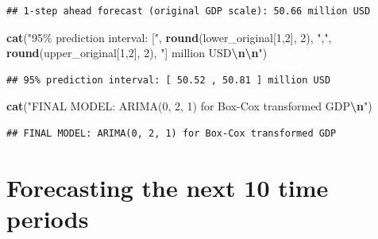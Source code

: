 \documentclass[
]{article}
\newenvironment{Shaded}{\begin{snugshade}}{\end{snugshade}}
\newcommand{\DecValTok}[1]{\textcolor[rgb]{0.00,0.00,0.81}{#1}}
\newcommand{\FunctionTok}[1]{\textcolor[rgb]{0.13,0.29,0.53}{\textbf{#1}}}
\newcommand{\NormalTok}[1]{#1}
\newcommand{\SpecialCharTok}[1]{\textcolor[rgb]{0.81,0.36,0.00}{\textbf{#1}}}
\newcommand{\StringTok}[1]{\textcolor[rgb]{0.31,0.60,0.02}{#1}}
\begin{document}
\begin{verbatim}
## 1-step ahead forecast (original GDP scale): 50.66 million USD
\end{verbatim}

\begin{Shaded}
\begin{Highlighting}[]
\FunctionTok{cat}\NormalTok{(}\StringTok{"95\% prediction interval: ["}\NormalTok{, }\FunctionTok{round}\NormalTok{(lower\_original[}\DecValTok{1}\NormalTok{,}\DecValTok{2}\NormalTok{], }\DecValTok{2}\NormalTok{), }\StringTok{","}\NormalTok{, }
    \FunctionTok{round}\NormalTok{(upper\_original[}\DecValTok{1}\NormalTok{,}\DecValTok{2}\NormalTok{], }\DecValTok{2}\NormalTok{), }\StringTok{"] million USD}\SpecialCharTok{\textbackslash{}n\textbackslash{}n}\StringTok{"}\NormalTok{)}
\end{Highlighting}
\end{Shaded}

\begin{verbatim}
## 95% prediction interval: [ 50.52 , 50.81 ] million USD
\end{verbatim}

\begin{Shaded}
\begin{Highlighting}[]
\FunctionTok{cat}\NormalTok{(}\StringTok{"FINAL MODEL: ARIMA(0, 2, 1) for Box{-}Cox transformed GDP}\SpecialCharTok{\textbackslash{}n}\StringTok{"}\NormalTok{)}
\end{Highlighting}
\end{Shaded}

\begin{verbatim}
## FINAL MODEL: ARIMA(0, 2, 1) for Box-Cox transformed GDP
\end{verbatim}

\section{Forecasting the next 10 time
periods}\label{forecasting-the-next-10-time-periods}
\end{document}
